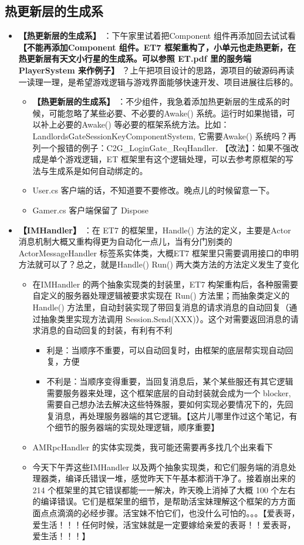 \documentclass[9pt, b5paper]{article}
\begin{document}
\subsection{热更新层的生成系}
\label{sec-7-1}
\begin{itemize}
\item \textbf{【热更新层的生成系】} ：下午家里试着把Component 组件再添加回去试试看 \textbf{【不能再添加Component 组件。ET7 框架重构了，小单元也走热更新，在热更新层有天文小行星的生成系。可以参照 ET.pdf 里的服务端 PlayerSystem 来作例子】} ？上午把项目设计的思路，源项目的破源码再读一读理一理，是希望游戏逻辑与游戏界面能够快速开发、项目进展往后移的。
\begin{itemize}
\item \textbf{【热更新层的生成系】} ：不少组件，我急着添加热更新层的生成系的时候，可能忽略了某些必要、不必要的Awake() 系统。运行时如果抛错，可以补上必要的Awake() 等必要的框架系统方法。比如：LandlordsGateSessionKeyComponentSystem, 它需要Awake() 系统吗？再列一个报错的例子：C2G\_LoginGate\_ReqHandler. 【改法】：如果不强改成是单个游戏逻辑，ET 框架里有这个逻辑处理，可以去参考原框架的写法与生成系是如何自动绑定的。
\item User.cs 客户端的话，不知道要不要修改。晚点儿的时候留意一下。
\item Gamer.cs 客户端保留了 Dispose
\end{itemize}
\item \textbf{【IMHandler】} ：在 ET7 的框架里，Handle() 方法的定义，主要是Actor 消息机制大概又重构得更为自动化一点儿，当有分门别类的ActorMessageHandler 标签系实体类，大概ET7 框架里只需要调用接口的申明方法就可以了？总之，就是Handle() Run() 两大类方法的方法定义发生了变化
\begin{itemize}
\item 在IMHandler 的两个抽象实现类的封装里，ET7 构架重构后，各种服需要自定义的服务器处理逻辑被要求实现在 Run() 方法里；而抽象类定义的Handle() 方法里，自动封装实现了带回复消息的请求消息的自动回复（通过抽象类里实现方法调用 Session.Send(XXX)）。这个对需要返回消息的请求消息的自动回复的封装，有利有不利
\begin{itemize}
\item 利是：当顺序不重要，可以自动回复时，由框架的底层帮实现自动回复，方便
\item 不利是：当顺序变得重要，当回复消息后，某个某些服还有其它逻辑需要服务器来处理，这个框架底层的自动封装就会成为一个 blocker, 需要自己想办法去解决这些特殊服，要如何实现必要情况下的，先回复消息，再处理服务器端的其它逻辑。【这片儿哪里作过这个笔记，有个细节的服务器端的实现处理逻辑，顺序重要】
\end{itemize}
\item AMRpcHandler 的实体实现类，我可能还需要再多找几个出来看下
\item 今天下午弄这些IMHandler 以及两个抽象实现类，和它们服务端的消息处理器类，编译氏错误一堆，感觉昨天下午基本都消干净了。接着崩出来的 214 个框架里的其它错误都能一一解决，昨天晚上消掉了大概 100 个左右的编译错误。它们是框架里的细节，是帮助活宝妹理解这个框架的方方面面点点滴滴的必经步骤。活宝妹不怕它们，也没什么可怕的。。。【爱表哥，爱生活！！！任何时候，活宝妹就是一定要嫁给亲爱的表哥！！爱表哥，爱生活！！！】
\end{itemize}
\end{itemize}
\end{document}
